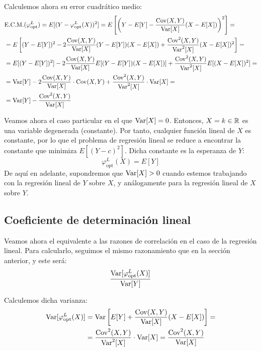 Calculemos ahora su error cuadrático medio:
\begin{align*}
    &\text{E.C.M.}(\varphi_{\text{opt}}^L)
    = E[(Y - \varphi_{\text{opt}}^L(X))^2]
    = E\left[\left(Y - E[Y] - \dfrac{\operatorname{Cov}(X,Y)}{\operatorname{Var}[X]}(X - E[X])\right)^2\right]
    =\\&=
    E\left[
        (Y-E[Y])^2 - 2\dfrac{\operatorname{Cov}(X,Y)}{\operatorname{Var}[X]}(Y-E[Y])(X-E[X]) + \dfrac{\operatorname{Cov}^2(X,Y)}{\operatorname{Var}^2[X]}(X-E[X])^2
    \right]=\\
    &= E[(Y-E[Y])^2] - 2\dfrac{\operatorname{Cov}(X,Y)}{\operatorname{Var}[X]}E[(Y-E[Y])(X-E[X])] + \dfrac{\operatorname{Cov}^2(X,Y)}{\operatorname{Var}^2[X]}E[(X-E[X])^2]
    =\\
    &= \operatorname{Var}[Y] - 2\dfrac{\operatorname{Cov}(X,Y)}{\operatorname{Var}[X]}\cdot \operatorname{Cov}(X,Y) + \dfrac{\operatorname{Cov}^2(X,Y)}{\operatorname{Var}^2[X]}\cdot \operatorname{Var}[X] =\\
    &= \operatorname{Var}[Y] - \dfrac{\operatorname{Cov}^2(X,Y)}{\operatorname{Var}[X]}
\end{align*}

Veamos ahora el caso particular en el que $\operatorname{Var}[X]=0$. Entonces, $X=k\in \mathbb{R}$ es una variable degenerada (constante). Por tanto, cualquier función lineal de $X$ es constante, por lo que el problema de regresión lineal se reduce a encontrar la constante que minimiza $E[(Y - c)^2]$. Dicha constante es la esperanza de $Y$:
\begin{equation*}
    \varphi_{\text{opt}}^L(X) = E[Y]
\end{equation*}
De aquí en adelante, supondremos que $\operatorname{Var}[X]>0$ cuando estemos trabajando con la regresión lineal de $Y$ sobre $X$, y análogamente para la regresión lineal de $X$ sobre $Y$. 

\subsection{Coeficiente de determinación lineal}

Veamos ahora el equivalente a las razones de correlación en el caso de la regresión lineal. Para calcularlo, seguimos el mismo razonamiento que en la sección anterior, y este será:
\begin{equation*}
    \dfrac{\operatorname{Var}[\varphi_{\text{opt}}^L(X)]}{\operatorname{Var}[Y]}
\end{equation*}

Calculemos dicha varianza:
\begin{align*}
    \operatorname{Var}[\varphi_{\text{opt}}^L(X)] &= \operatorname{Var}\left[E[Y] + \dfrac{\operatorname{Cov}(X,Y)}{\operatorname{Var}[X]}(X - E[X])\right]
    =\\&=
    \dfrac{\operatorname{Cov}^2(X,Y)}{\operatorname{Var}^2[X]}\cdot \operatorname{Var}[X]= \dfrac{\operatorname{Cov}^2(X,Y)}{\operatorname{Var}[X]}
\end{align*}

